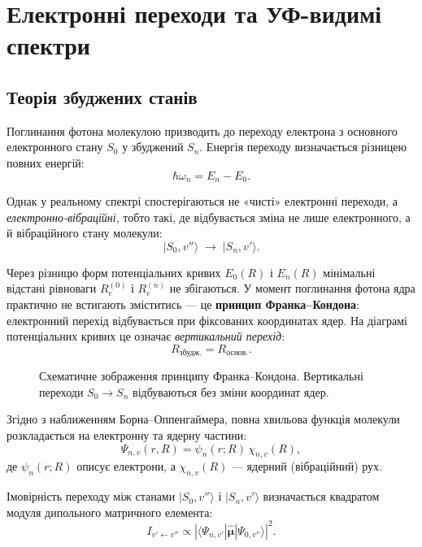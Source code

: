 \section{Електронні переходи та УФ-видимі спектри}\label{sec:electronic}

\subsection{Теорія збуджених станів}

Поглинання фотона молекулою призводить до переходу електрона
з основного електронного стану $S_0$ у збуджений $S_n$.
Енергія переходу визначається різницею повних енергій:
\[
    \hbar\omega_n = E_n - E_0.
\]

Однак у реальному спектрі спостерігаються не «чисті» електронні переходи,
а \emph{електронно-вібраційні}, тобто такі, де відбувається зміна не лише електронного,
а й вібраційного стану молекули:
\[
    |S_0, v''\rangle \;\longrightarrow\; |S_n, v'\rangle.
\]

Через різницю форм потенціальних кривих $E_0(R)$ і $E_n(R)$
мінімальні відстані рівноваги $R_e^{(0)}$ і $R_e^{(n)}$ не збігаються.
У момент поглинання фотона ядра практично не встигають зміститись —
це \textbf{принцип Франка–Кондона}:
електронний перехід відбувається при фіксованих координатах ядер.
На діаграмі потенціальних кривих це означає \emph{вертикальний перехід}:
\[
    R_{\text{збудж.}} = R_{\text{основ.}}.
\]

\begin{figure}[h!]\centering
    \caption{Схематичне зображення принципу Франка–Кондона.
    Вертикальні переходи $S_0 \to S_n$ відбуваються без зміни координат ядер.}
    \label{pic:franck_condon}
\end{figure}

Згідно з наближенням Борна–Оппенгаймера,
повна хвильова функція молекули розкладається на електронну та ядерну частини:
\[
\Psi_{n,v}(r,R) = \psi_n(r;R)\,\chi_{n,v}(R),
\]
де $\psi_n(r;R)$ описує електрони, а $\chi_{n,v}(R)$ — ядерний (вібраційний) рух.

Імовірність переходу між станами $|S_0,v''\rangle$ і $|S_n,v'\rangle$
визначається квадратом модуля дипольного матричного елемента:
\[
I_{v'\!\leftarrow\!v''} \propto
\left| \langle \Psi_{n,v'} | \hat{\boldsymbol{\mu}} | \Psi_{0,v''} \rangle \right|^2.
\]

